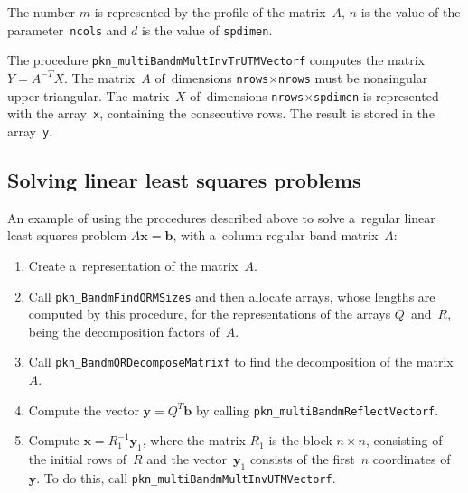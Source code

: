 The number $m$ is represented by the profile of the matrix~$A$,
$n$ is the value of the parameter~\texttt{ncols} and $d$ is the value of
\texttt{spdimen}.

\vspace{\bigskipamount}
\begin{sloppypar}
The procedure \texttt{pkn\_multiBandmMultInvTrUTMVectorf} computes the matrix
$Y=A^{-T}X$.
The matrix~$A$ of~dimensions \texttt{nrows}$\times$\texttt{nrows}
must be nonsingular upper triangular. The matrix~$X$ of~dimensions
\texttt{nrows}$\times$\texttt{spdimen} is represented with the array~\texttt{x},
containing the consecutive rows. The result is stored in the array~\texttt{y}.
\end{sloppypar}


\subsection{\label{ssect:bandm:rlsq}Solving linear least squares problems}

An example of using the procedures described above to solve a~regular linear
least squares problem $A\bm{x}=\bm{b}$, with a~column-regular band matrix~$A$:
\begin{enumerate}
  \item Create a~representation of the matrix~$A$.
  \item Call \texttt{pkn\_BandmFindQRMSizes} and then allocate
    arrays, whose lengths are computed by this procedure, for the
    representations of the arrays $Q$~and~$R$, being the decomposition
    factors of~$A$.
  \item Call \texttt{pkn\_BandmQRDecomposeMatrixf} to find the decomposition
    of the matrix~$A$.
  \item Compute the vector $\bm{y}=Q^T\bm{b}$ by calling
    \texttt{pkn\_multiBandmReflectVectorf}.
  \item Compute $\bm{x}=R_1^{-1}\bm{y}_1$, where the matrix $R_1$ is the block
    $n\times n$, consisting of the initial rows of~$R$ and the vector~$\bm{y}_1$
    consists of the first~$n$ coordinates of~$\bm{y}$. To do this, call
    \texttt{pkn\_multiBandmMultInvUTMVectorf}.
\end{enumerate}

